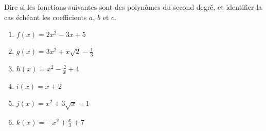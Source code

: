 
\begin{exercice}\label{exosmath-0030}

    Dire si les fonctions suivantes sont des polynômes du second degré, et identifier la cas échéant les coefficients \( a\), \( b\) et \( c\).
    \begin{multicols}{2}
    \begin{enumerate}
        \item
            \( f(x)=2x^2-3x+5\)
        \item
            \( g(x)=3x^2+x\sqrt{2}-\frac{1}{ 3 }\)
        \item
            \( h(x)=x^2-\frac{ 2 }{ x }+4\)
        \item
            \( i(x)=x+2\)
        \item
            \( j(x)=x^2+3\sqrt{x}-1\)
        \item
            \( k(x)=-x^2+\frac{ x }{ 3 }+7\)
    \end{enumerate}
    \end{multicols}

\end{exercice}
